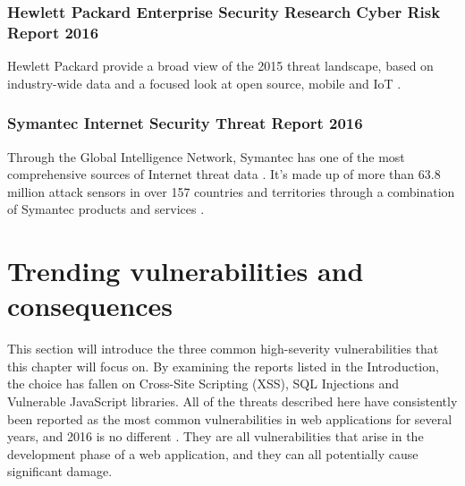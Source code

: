 \subsubsection{Hewlett Packard Enterprise Security Research Cyber Risk Report 2016}
Hewlett Packard provide a broad view of the 2015 threat landscape, based on industry-wide data and a focused look at open source, mobile and IoT \cite{HP2016}.
\subsubsection{Symantec Internet Security Threat Report 2016}
Through the Global Intelligence Network, Symantec has one of the most comprehensive sources of Internet threat data \cite{Symantec2016}. It's made up of more than 63.8 million attack sensors in over 157 countries and territories through a combination of Symantec products and services \cite{Symantec2016}.
\section{Trending vulnerabilities and consequences}
This section will introduce the three common high-severity vulnerabilities that this chapter will focus on. By examining the reports listed in the Introduction, the choice has fallen on Cross-Site Scripting (XSS), SQL Injections and Vulnerable JavaScript libraries. All of the threats described here have consistently been reported as the most common vulnerabilities in web applications for several years, and 2016 is no different \cite{OWASP2010}\cite{OWASP2013}\cite{Acunetix2016}. They are all vulnerabilities that arise in the development phase of a web application, and they can all potentially cause significant damage. 
